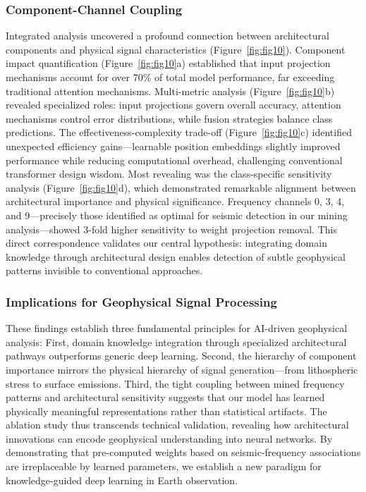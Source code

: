 \documentclass[preprint,review,12pt,authoryear]{elsarticle}
\begin{document}
\subsubsection{Component-Channel Coupling}
Integrated analysis uncovered a profound connection between architectural components and physical signal characteristics (Figure~\ref{fig:fig10}). Component impact quantification (Figure~\ref{fig:fig10}a) established that input projection mechanisms account for over 70\% of total model performance, far exceeding traditional attention mechanisms. Multi-metric analysis (Figure~\ref{fig:fig10}b) revealed specialized roles: input projections govern overall accuracy, attention mechanisms control error distributions, while fusion strategies balance class predictions. The effectiveness-complexity trade-off (Figure~\ref{fig:fig10}c) identified unexpected efficiency gains---learnable position embeddings slightly improved performance while reducing computational overhead, challenging conventional transformer design wisdom.
Most revealing was the class-specific sensitivity analysis (Figure~\ref{fig:fig10}d), which demonstrated remarkable alignment between architectural importance and physical significance. Frequency channels 0, 3, 4, and 9---precisely those identified as optimal for seismic detection in our mining analysis---showed 3-fold higher sensitivity to weight projection removal. This direct correspondence validates our central hypothesis: integrating domain knowledge through architectural design enables detection of subtle geophysical patterns invisible to conventional approaches.

\subsubsection{Implications for Geophysical Signal Processing} 
These findings establish three fundamental principles for AI-driven geophysical analysis: First, domain knowledge integration through specialized architectural pathways outperforms generic deep learning. Second, the hierarchy of component importance mirrors the physical hierarchy of signal generation---from lithospheric stress to surface emissions. Third, the tight coupling between mined frequency patterns and architectural sensitivity suggests that our model has learned physically meaningful representations rather than statistical artifacts.
The ablation study thus transcends technical validation, revealing how architectural innovations can encode geophysical understanding into neural networks. By demonstrating that pre-computed weights based on seismic-frequency associations are irreplaceable by learned parameters, we establish a new paradigm for knowledge-guided deep learning in Earth observation.
\end{document}
